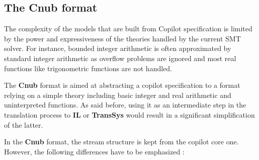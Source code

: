 



\subsection{The \textbf{Cnub} format}

The complexity of the models that are built from Copilot specification is limited by the power and expressiveness of the theories handled by the current SMT solver. For instance, bounded integer arithmetic is often approximated by standard integer arithmetic as overflow problems are ignored and most real functions like trigonometric functions are not handled.

The \textbf{Cnub} format is aimed at abstracting a copilot specification to a format relying on a simple theory including basic integer and real arithmetic and uninterpreted functions. As said before, using it as an intermediate step in the translation process to \textbf{IL} or \textbf{TransSys} would result in a significant simplification of the latter.


In the \textbf{Cnub} format, the stream structure is kept from the copilot core one. However, the following differences have to be emphasized :

